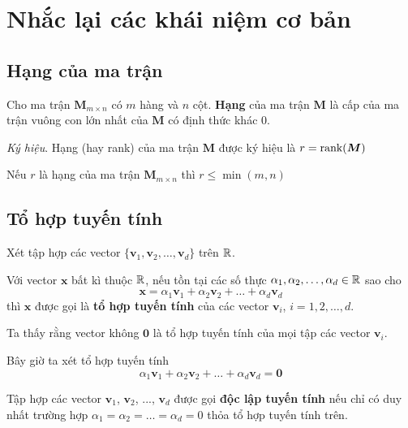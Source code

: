 \chapter{Nhắc lại các khái niệm cơ bản}

\section{Hạng của ma trận}

\begin{definition}
    
    Cho ma trận $\bm{M}_{m \times n}$ có $m$ hàng và $n$ cột. \textbf{Hạng} của ma trận $\bm{M}$ là cấp của ma trận vuông con lớn nhất của $\bm{M}$ có định thức khác 0.

    \textit{Ký hiệu}. Hạng (hay rank) của ma trận $\bm{M}$ được ký hiệu là $r = \text{rank}(\bm{M})$

\end{definition}

\begin{remark}
    Nếu $r$ là hạng của ma trận $\bm{M}_{m \times n}$ thì $r \leq \min (m, n)$
\end{remark}

\section{Tổ hợp tuyến tính}

Xét tập hợp các vector $\{\bm{v}_1, \bm{v}_2, \ldots, \bm{v}_d\}$ trên $\mathbb{R}$.

\begin{definition}
Với vector $\bm{x}$ bất kì thuộc $\mathbb{R}$, nếu tồn tại các số thực $\alpha_1, \alpha_2, \ldots, \alpha_d \in \mathbb{R}$ sao cho
\[\bm{x} = \alpha_1 \bm{v}_1 + \alpha_2 \bm{v}_2 + \ldots + \alpha_d \bm{v}_d\]
thì $\bm{x}$ được gọi là \textbf{tổ hợp tuyến tính} của các vector $\bm{v}_i$, $i = 1, 2, \ldots, d$.
\end{definition}

Ta thấy rằng vector không $\bm{0}$ là tổ hợp tuyến tính của mọi tập các vector $\bm{v}_i$.

Bây giờ ta xét tổ hợp tuyến tính
\[\alpha_1 \bm{v}_1 + \alpha_2 \bm{v}_2 + \ldots + \alpha_d \bm{v}_d = \bm{0}\]

\begin{definition}
    Tập hợp các vector $\bm{v}_1$, $\bm{v}_2$, ..., $\bm{v}_d$ được gọi \textbf{độc lập tuyến tính} nếu
    chỉ có duy nhất trường hợp $\alpha_1 = \alpha_2 = \ldots = \alpha_d = 0$ thỏa tổ hợp tuyến tính trên.    
\end{definition}

